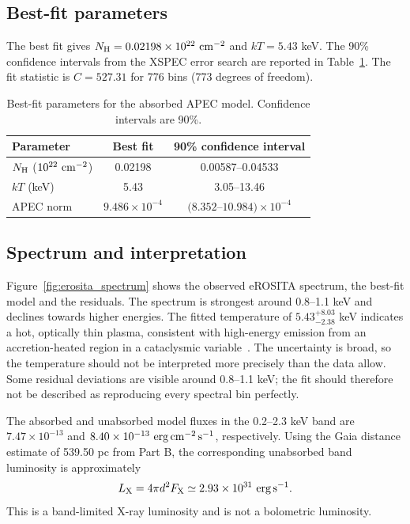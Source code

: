 \documentclass[12pt,a4paper]{article}
\begin{document}
\subsection{Best-fit parameters}
The best fit gives $N_{\rm H}=0.02198\times10^{22}\ {\rm cm}^{-2}$ and $kT=5.43$ keV. The 90\% confidence intervals from the XSPEC error search are reported in Table~\ref{tab:xrayfit}. The fit statistic is $C=527.31$ for 776 bins (773 degrees of freedom).

\begin{table}[!ht]
\centering\small
\begin{tabular}{lcc}
\toprule
\rowcolor{lightblue}\textcolor{reportblue}{\textbf{Parameter}} &
\textcolor{reportblue}{\textbf{Best fit}} &
\textcolor{reportblue}{\textbf{90\% confidence interval}}\\
\midrule
$N_{\rm H}$ ($10^{22}\ {\rm cm}^{-2}$) & 0.02198 & 0.00587--0.04533\\
$kT$ (keV) & 5.43 & 3.05--13.46\\
APEC norm & $9.486\times10^{-4}$ & $(8.352$--$10.984)\times10^{-4}$\\
\bottomrule
\end{tabular}
\caption{Best-fit parameters for the absorbed APEC model. Confidence intervals are 90\%.}
\label{tab:xrayfit}
\end{table}

\subsection{Spectrum and interpretation}
Figure~\ref{fig:erosita_spectrum} shows the observed eROSITA spectrum, the best-fit model and the residuals. The spectrum is strongest around 0.8--1.1 keV and declines towards higher energies. The fitted temperature of $5.43^{+8.03}_{-2.38}$ keV indicates a hot, optically thin plasma, consistent with high-energy emission from an accretion-heated region in a cataclysmic variable~\cite{pageshaw}. The uncertainty is broad, so the temperature should not be interpreted more precisely than the data allow. Some residual deviations are visible around 0.8--1.1 keV; the fit should therefore not be described as reproducing every spectral bin perfectly.

The absorbed and unabsorbed model fluxes in the 0.2--2.3 keV band are $7.47\times10^{-13}$ and $8.40\times10^{-13}\ {\rm erg\,cm^{-2}\,s^{-1}}$, respectively. Using the Gaia distance estimate of 539.50 pc from Part B, the corresponding unabsorbed band luminosity is approximately
\[
L_{\rm X}=4\pi d^2F_{\rm X}\simeq2.93\times10^{31}\ {\rm erg\,s^{-1}}.
\]
This is a band-limited X-ray luminosity and is not a bolometric luminosity.
\end{document}
